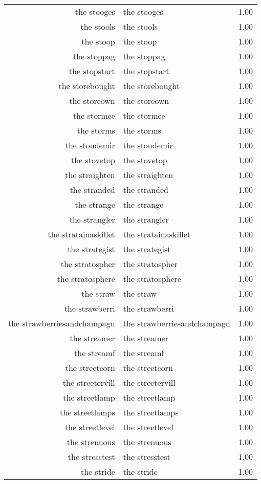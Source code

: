 \begin{table}[ht]
\begin{tabular}{rlr}
  the stooges & the stooges & 1.00 \\ 
  the stools & the stools & 1.00 \\ 
  the stoop & the stoop & 1.00 \\ 
  the stoppag & the stoppag & 1.00 \\ 
  the stopstart & the stopstart & 1.00 \\ 
  the storebought & the storebought & 1.00 \\ 
  the storeown & the storeown & 1.00 \\ 
  the stormee & the stormee & 1.00 \\ 
  the storms & the storms & 1.00 \\ 
  the stoudemir & the stoudemir & 1.00 \\ 
  the stovetop & the stovetop & 1.00 \\ 
  the straighten & the straighten & 1.00 \\ 
  the stranded & the stranded & 1.00 \\ 
  the strange & the strange & 1.00 \\ 
  the strangler & the strangler & 1.00 \\ 
  the stratainaskillet & the stratainaskillet & 1.00 \\ 
  the strategist & the strategist & 1.00 \\ 
  the stratospher & the stratospher & 1.00 \\ 
  the stratosphere & the stratosphere & 1.00 \\ 
  the straw & the straw & 1.00 \\ 
  the strawberri & the strawberri & 1.00 \\ 
  the strawberriesandchampagn & the strawberriesandchampagn & 1.00 \\ 
  the streamer & the streamer & 1.00 \\ 
  the streamf & the streamf & 1.00 \\ 
  the streetcorn & the streetcorn & 1.00 \\ 
  the streetervill & the streetervill & 1.00 \\ 
  the streetlamp & the streetlamp & 1.00 \\ 
  the streetlamps & the streetlamps & 1.00 \\ 
  the streetlevel & the streetlevel & 1.00 \\ 
  the strenuous & the strenuous & 1.00 \\ 
  the stresstest & the stresstest & 1.00 \\ 
  the stride & the stride & 1.00 \\ 

\end{tabular}
\end{table}

